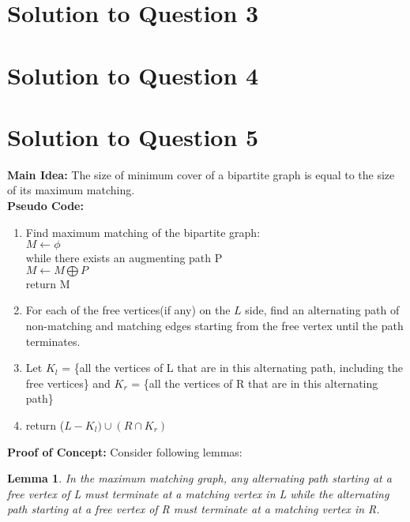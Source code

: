 \documentclass[11pt]{article}
\newtheorem{lemma}[theorem]{Lemma}
\begin{document}
\section{Solution to Question 3}



\section{Solution to Question 4}



\section{Solution to Question 5} 

\textbf{Main Idea:}
The size of minimum cover of a bipartite graph is equal to the size of its maximum matching. \\
\textbf{Pseudo Code:}
\begin{enumerate}
	\item Find maximum matching of the bipartite graph: \\
	\indent $M \leftarrow \phi$ \\
			while there exists an augmenting path P \\
				$M \leftarrow M \bigoplus P$ \\
			return M
	\item For each of the free vertices(if any) on the $L$ side, find an alternating path of non-matching and matching edges
	starting from the free vertex until the path terminates.
	\item Let $K_l$ = \{all the vertices of L that are in this alternating path, including the free vertices\} and 
			  $K_r$ = \{all the vertices of R that are in this alternating path\}
	\item return ($L - K_l) \cup (R \cap K_r)$ 
\end{enumerate}
\textbf{Proof of Concept:}
Consider following lemmas:
\begin{lemma}
	In the maximum matching graph, any alternating path starting at a free vertex of L must terminate at a matching
	vertex in L while the alternating path starting at a free vertex of R must terminate at a matching vertex in R.
\end{lemma}
\end{document}
